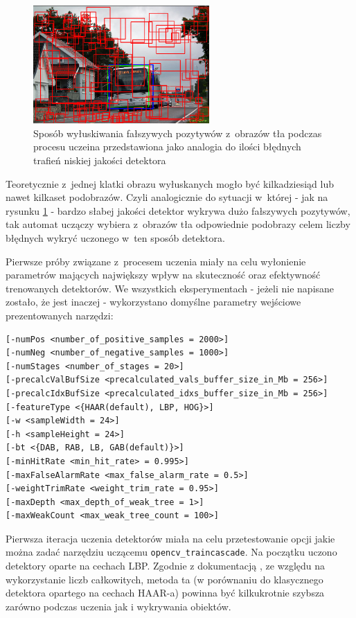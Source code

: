 \begin{figure}[!h]
	\centering
	\includegraphics[width=0.6\textwidth]{img/exp_false_positive_mechanism}
	\caption{Sposób wyłuskiwania fałszywych pozytywów z~obrazów tła podczas procesu
		uczeina przedstawiona jako analogia do ilości błędnych trafień niskiej
		jakości detektora}
	\label{fig:exp_false_positive_mechanism}
\end{figure}

Teoretycznie z~jednej klatki obrazu wyłuskanych mogło być kilkadziesiąd lub
nawet kilkaset podobrazów. Czyli analogicznie do sytuacji w~której - jak 
na rysunku 
\ref{fig:exp_false_positive_mechanism}
- bardzo słabej jakości detektor wykrywa dużo fałszywych pozytywów, tak
automat uczączy wybiera z~obrazów tła odpowiednie podobrazy celem liczby
błędnych wykryć uczonego w~ten sposób detektora.

Pierwsze próby związane z~procesem uczenia miały na celu 
wyłonienie parametrów mających największy wpływ na skuteczność 
oraz efektywność trenowanych detektorów.
We wszystkich eksperymentach - jeżeli nie napisane zostało, że
jest inaczej - wykorzystano domyślne parametry wejściowe prezentowanych 
narzędzi:

\begin{lstlisting}
[-numPos <number_of_positive_samples = 2000>]
[-numNeg <number_of_negative_samples = 1000>]
[-numStages <number_of_stages = 20>]
[-precalcValBufSize <precalculated_vals_buffer_size_in_Mb = 256>]
[-precalcIdxBufSize <precalculated_idxs_buffer_size_in_Mb = 256>]
[-featureType <{HAAR(default), LBP, HOG}>]
[-w <sampleWidth = 24>]
[-h <sampleHeight = 24>]
[-bt <{DAB, RAB, LB, GAB(default)}>]
[-minHitRate <min_hit_rate> = 0.995>]
[-maxFalseAlarmRate <max_false_alarm_rate = 0.5>]
[-weightTrimRate <weight_trim_rate = 0.95>]
[-maxDepth <max_depth_of_weak_tree = 1>]
[-maxWeakCount <max_weak_tree_count = 100>]
\end{lstlisting}

Pierwsza iteracja uczenia detektorów miała na celu przetestowanie
opcji jakie można zadać narzędziu uczącemu \verb|opencv_traincascade|.
Na początku
uczono detektory oparte na
cechach LBP. Zgodnie z dokumentacją \cite{OCV:cascadeclassifiertraining}, ze względu na wykorzystanie liczb całkowitych,
metoda ta (w porównaniu do klasycznego detektora opartego na cechach HAAR-a) powinna być
kilkukrotnie szybsza zarówno podczas uczenia jak i wykrywania obiektów.

